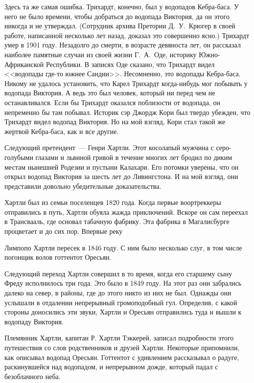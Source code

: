 \documentclass[12pt,a4paper,twoside,openany,svgnames]{memoir}
\begin{document}
Здесь та же самая ошибка. Трихардт, конечно, был у водопадов Кебра-баса. У него не было времени, чтобы добраться до водопада Виктория, да он этого никогда и не утверждал. (Сотрудник архива Претории Д.~У.~Крюгер в своей работе, написанной несколько лет назад, доказал это совершенно ясно.) Трихардт умер в 1901 году. Незадолго до смерти, в возрасте девяноста лет, он рассказал наиболее памятные случаи из своей жизни Г.~А.~Оде, историку Южно-Африканской Республики. В записях Оде сказано, что Трихардт видел <<водопады где-то южнее Сандии>>. Несомненно, это водопады Кебра-баса. Никому не удалось установить, что Карел Трихардт когда-нибудь мог побывать у водопада Виктория. А ведь это был человек, который ни перед чем не останавливался. Если бы Трихардт оказался поблизости от водопада, он непременно бы там побывал. Историк сэр Джордж Кори был твердо убежден, что Трихардт видел водопад Виктория. Но на мой взгляд, Кори стал такой же жертвой Кебра-баса, как и все другие.

Следующий претендент~--- Генри Хартли. Этот косолапый мужчина с серо-голубыми глазами и львиной гривой в течение многих лет бродил по диким местам нынешней Родезии и пустыни Калахари. Его потомки уверены, что он открыл водопад Виктория за шесть лет до Ливингстона. И на мой взгляд, они представили довольно убедительные доказательства.

Хартли был из семьи поселенцев 1820 года. Когда первые воортреккеры отправились в путь, Хартли обуяла жажда приключений. Вскоре он сам переехал в Трансвааль, где основал табачную фабрику. Эта фабрика в Магалисбурге процветает и до сих пор. Впервые реку

Лимпопо Хартли пересек в 1846 году. С ним было несколько слуг, в том числе погонщик волов готтентот Оресьян.

Следующий переход Хартли совершил в то время, когда его старшему сыну Фреду исполнилось три года. Это было в 1849 году. На этот раз они забрались далеко на север, в районы, где до этого никто из них не был. Однажды они услышали в отдалении непрерывный громоподобный гул. Определив, с какой стороны доносились эти звуки, Хартли и Оресьян отправились туда и вышли к водопаду Виктория.

Племянник Хартли, капитан Р. Хартли Тэккерей, записал подробности этого путешествия со слов родственников и друзей Хартли. Некоторые припомнили, как описывал водопад Оресьян. Готтентот с удивлением рассказывал о радуге, раскинувшейся над водопадом, и непрерывном дожде, который падал с безоблачного неба.
\end{document}
